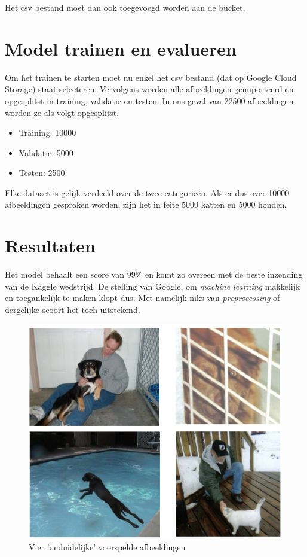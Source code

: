 Het csv bestand moet dan ook toegevoegd worden aan de bucket.

\section{Model trainen en evalueren}
\label{sec:google-automl-train}

Om het trainen te starten moet nu enkel het csv bestand (dat op Google Cloud Storage) staat selecteren. Vervolgens worden alle afbeeldingen geïmporteerd en opgesplitst in training, validatie en testen. In ons geval van 22500 afbeeldingen worden ze als volgt opgesplitst.

\begin{itemize}
    \item Training: 10000
    \item Validatie: 5000
    \item Testen: 2500
\end{itemize}

Elke dataset is gelijk verdeeld over de twee categorieën. Als er dus over 10000 afbeeldingen gesproken worden, zijn het in feite 5000 katten en 5000 honden.

\section{Resultaten}
\label{sec:google-automl-results}

Het model behaalt een score van 99\% en komt zo overeen met de beste inzending van de Kaggle wedstrijd. De stelling van Google, om \textit{machine learning} makkelijk en toegankelijk te maken klopt dus. Met namelijk niks van \textit{preprocessing} of dergelijke scoort het toch uitstekend.

\begin{figure}
    \centering
    \includegraphics[width=\linewidth]{img/google-automl-pred.png}
    \caption{Vier 'onduidelijke' voorspelde afbeeldingen}
    \label{fig:google-predictions}
\end{figure}

